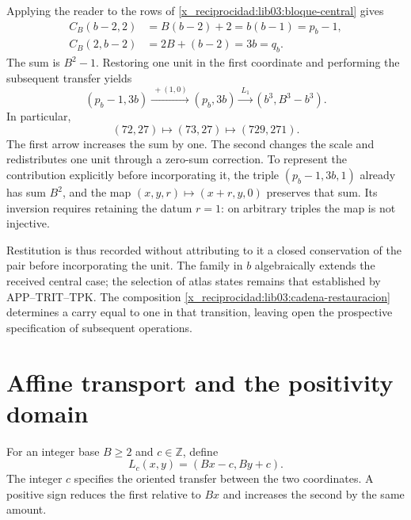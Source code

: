 Applying the reader to the rows of \eqref{x_reciprocidad:lib03:bloque-central} gives
\begin{align}
 C_B(b-2,2)&=B(b-2)+2=b(b-1)=p_b-1,\\
 C_B(2,b-2)&=2B+(b-2)=3b=q_b.
 \label{x_reciprocidad:lib03:concatenaciones}
\end{align}
The sum is \(B^2-1\). Restoring one unit in the first
coordinate and performing the subsequent transfer yields
\begin{equation}
 (p_b-1,3b)\xrightarrow{\ +(1,0)\ }(p_b,3b)
 \xrightarrow{\ L_1\ }(b^3,B^3-b^3).
 \label{x_reciprocidad:lib03:cadena-restauracion}
\end{equation}
In particular,
\begin{equation}
 (72,27)\longmapsto(73,27)\longmapsto(729,271).
 \label{x_reciprocidad:lib03:cadena-central}
\end{equation}
The first arrow increases the sum by one. The second changes the scale
and redistributes one unit through a zero-sum correction. To represent
the contribution explicitly before incorporating it, the triple
\((p_b-1,3b,1)\) already has sum \(B^2\), and the map
\((x,y,r)\mapsto(x+r,y,0)\) preserves that sum. Its inversion requires
retaining the datum \(r=1\): on arbitrary triples the map is not
injective.

Restitution is thus recorded without attributing to it a closed
conservation of the pair before incorporating the unit. The family in \(b\)
algebraically extends the received central case; the selection of
atlas states remains that established by APP--TRIT--TPK.
The composition \eqref{x_reciprocidad:lib03:cadena-restauracion} determines a carry
equal to one in that transition, leaving open the prospective
specification of subsequent operations.

\section{Affine transport and the positivity domain}
\label{x_reciprocidad:lib03:afin}

\begin{definition}
\label{x_reciprocidad:lib03:def-transporte}
For an integer base \(B\geq2\) and \(c\in\mathbb Z\), define
\begin{equation}
 L_c(x,y)=(Bx-c,By+c).
 \label{x_reciprocidad:lib03:lc}
\end{equation}
The integer \(c\) specifies the oriented transfer between the two
coordinates. A positive sign reduces the first relative to \(Bx\)
and increases the second by the same amount.
\end{definition}

